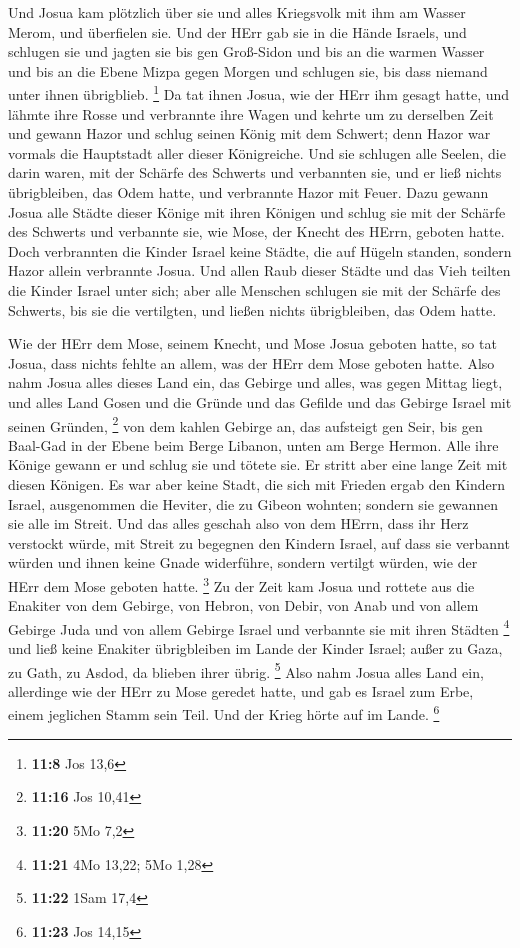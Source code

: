  Und Josua kam plötzlich über sie und alles Kriegsvolk mit
ihm am Wasser Merom, und überfielen sie.  Und der HErr gab
sie in die Hände Israels, und schlugen sie und jagten sie bis gen
Groß-Sidon und bis an die warmen Wasser und bis an die Ebene Mizpa gegen
Morgen und schlugen sie, bis dass niemand unter ihnen übrigblieb.
\footnote{\textbf{11:8} Jos 13,6}  Da tat ihnen Josua, wie
der HErr ihm gesagt hatte, und lähmte ihre Rosse und verbrannte ihre
Wagen  und kehrte um zu derselben Zeit und gewann Hazor und
schlug seinen König mit dem Schwert; denn Hazor war vormals die
Hauptstadt aller dieser Königreiche.  Und sie schlugen alle
Seelen, die darin waren, mit der Schärfe des Schwerts und verbannten
sie, und er ließ nichts übrigbleiben, das Odem hatte, und verbrannte
Hazor mit Feuer.  Dazu gewann Josua alle Städte dieser
Könige mit ihren Königen und schlug sie mit der Schärfe des Schwerts und
verbannte sie, wie Mose, der Knecht des HErrn, geboten hatte.
 Doch verbrannten die Kinder Israel keine Städte, die auf
Hügeln standen, sondern Hazor allein verbrannte Josua.  Und
allen Raub dieser Städte und das Vieh teilten die Kinder Israel unter
sich; aber alle Menschen schlugen sie mit der Schärfe des Schwerts, bis
sie die vertilgten, und ließen nichts übrigbleiben, das Odem hatte.

 Wie der HErr dem Mose, seinem Knecht, und Mose Josua
geboten hatte, so tat Josua, dass nichts fehlte an allem, was der HErr
dem Mose geboten hatte.  Also nahm Josua alles dieses Land
ein, das Gebirge und alles, was gegen Mittag liegt, und alles Land Gosen
und die Gründe und das Gefilde und das Gebirge Israel mit seinen
Gründen, \footnote{\textbf{11:16} Jos 10,41}  von dem
kahlen Gebirge an, das aufsteigt gen Seir, bis gen Baal-Gad in der Ebene
beim Berge Libanon, unten am Berge Hermon. Alle ihre Könige gewann er
und schlug sie und tötete sie.  Er stritt aber eine lange
Zeit mit diesen Königen.  Es war aber keine Stadt, die sich
mit Frieden ergab den Kindern Israel, ausgenommen die Heviter, die zu
Gibeon wohnten; sondern sie gewannen sie alle im Streit. 
Und das alles geschah also von dem HErrn, dass ihr Herz verstockt würde,
mit Streit zu begegnen den Kindern Israel, auf dass sie verbannt würden
und ihnen keine Gnade widerführe, sondern vertilgt würden, wie der HErr
dem Mose geboten hatte. \footnote{\textbf{11:20} 5Mo 7,2} 
Zu der Zeit kam Josua und rottete aus die Enakiter von dem Gebirge, von
Hebron, von Debir, von Anab und von allem Gebirge Juda und von allem
Gebirge Israel und verbannte sie mit ihren Städten \footnote{\textbf{11:21}
  4Mo 13,22; 5Mo 1,28}  und ließ keine Enakiter
übrigbleiben im Lande der Kinder Israel; außer zu Gaza, zu Gath, zu
Asdod, da blieben ihrer übrig. \footnote{\textbf{11:22} 1Sam 17,4}
 Also nahm Josua alles Land ein, allerdinge wie der HErr zu
Mose geredet hatte, und gab es Israel zum Erbe, einem jeglichen Stamm
sein Teil. Und der Krieg hörte auf im Lande. \footnote{\textbf{11:23}
  Jos 14,15}

